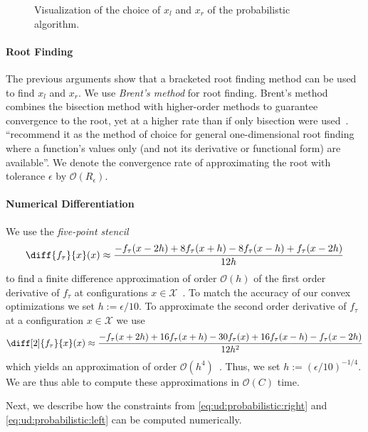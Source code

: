 \begin{figure}
    \centering
    
    \caption{Visualization of the choice of $x_l$ and $x_r$ of the probabilistic algorithm.}
    \label{fig:probabilistic_algorithm}
\end{figure}

\paragraph{Root Finding} The previous arguments show that a bracketed root finding method can be used to find $x_l$ and $x_r$. We use \emph{Brent's method} for root finding. Brent's method combines the bisection method with higher-order methods to guarantee convergence to the root, yet at a higher rate than if only bisection were used~\cite{Press2007}. \citeauthor*{Press2007}~\cite{Press2007} ``recommend it as the method of choice for general one-dimensional
root finding where a function’s values only (and not its derivative or functional form)
are available''. We denote the convergence rate of approximating the root with tolerance $\epsilon$ by $\mathcal{O}(R_{\epsilon})$.

\paragraph{Numerical Differentiation} We use the \emph{five-point stencil} \begin{align*}
    \diff{f_{\tau}}{x}(x) \approx \frac{-f_{\tau}(x - 2h) + 8 f_{\tau}(x + h) - 8 f_{\tau}(x - h) + f_{\tau}(x - 2h)}{12h}
\end{align*} to find a finite difference approximation of order $\mathcal{O}(h)$ of the first order derivative of $f_{\tau}$ at configurations $x \in \mathcal{X}$~\cite{Sauer2011}. To match the accuracy of our convex optimizations we set $h := \epsilon / 10$. To approximate the second order derivative of $f_{\tau}$ at a configuration $x \in \mathcal{X}$ we use \begin{align*}
    \diff[2]{f_{\tau}}{x}(x) \approx \frac{-f_{\tau}(x + 2h) + 16 f_{\tau}(x+h) - 30 f_{\tau}(x) + 16 f_{\tau}(x-h) - f_{\tau}(x - 2h)}{12 h^2}
\end{align*} which yields an approximation of order $\mathcal{O}(h^4)$~\cite{Sauer2011}. Thus, we set $h := (\epsilon / 10)^{-1/4}$. We are thus able to compute these approximations in $\mathcal{O}(C)$ time.

Next, we describe how the constraints from \cref{eq:ud:probabilistic:right} and \cref{eq:ud:probabilistic:left} can be computed numerically.

